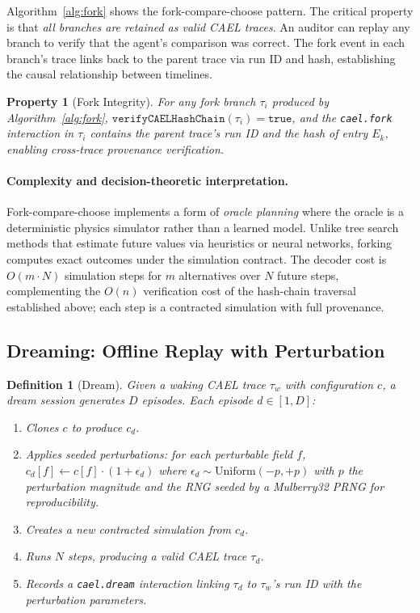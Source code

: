 \documentclass[sigconf,nonacm]{acmart}
\newtheorem{definition}{Definition}
\newtheorem{property}{Property}
\newcommand{\caelstate}[1]{E_{#1}}
\begin{document}
Algorithm~\ref{alg:fork} shows the fork-compare-choose pattern.
The critical property is that \emph{all branches are retained as
valid CAEL traces}. An auditor can replay any branch to verify
that the agent's comparison was correct. The fork event in each
branch's trace links back to the parent trace via run ID and
hash, establishing the causal relationship between timelines.

\begin{property}[Fork Integrity]
\label{prop:fork}
For any fork branch $\tau_i$ produced by Algorithm~\ref{alg:fork},
$\texttt{verifyCAELHashChain}(\tau_i) = \texttt{true}$, and
the \texttt{cael.fork} interaction in $\tau_i$ contains the
parent trace's run ID and the hash of entry $\caelstate{k}$,
enabling cross-trace provenance verification.
\end{property}

\paragraph{Complexity and decision-theoretic interpretation.}
Fork-compare-choose implements a form of \emph{oracle planning}
where the oracle is a deterministic physics simulator rather than
a learned model. Unlike tree search methods that estimate future
values via heuristics or neural networks, forking computes exact
outcomes under the simulation contract. The decoder cost is
$O(m \cdot N)$ simulation steps for $m$ alternatives over $N$
future steps, complementing the $O(n)$ verification cost of the
hash-chain traversal established above; each step is a contracted
simulation with full provenance.

\subsection{Dreaming: Offline Replay with Perturbation}

\begin{definition}[Dream]
\label{def:dream}
Given a waking CAEL trace $\tau_w$ with configuration $c$, a dream
session generates $D$ episodes. Each episode $d \in [1, D]$:
\begin{enumerate}
  \item Clones $c$ to produce $c_d$.
  \item Applies seeded perturbations: for each perturbable
    field $f$, $c_d[f] \leftarrow c[f] \cdot (1 + \epsilon_d)$
    where $\epsilon_d \sim \text{Uniform}(-p, +p)$ with $p$ the
    perturbation magnitude and the RNG seeded by a Mulberry32
    PRNG for reproducibility.
  \item Creates a new contracted simulation from $c_d$.
  \item Runs $N$ steps, producing a valid CAEL trace $\tau_d$.
  \item Records a \texttt{cael.dream} interaction linking
    $\tau_d$ to $\tau_w$'s run ID with the perturbation parameters.
\end{enumerate}
\end{definition}
\end{document}
